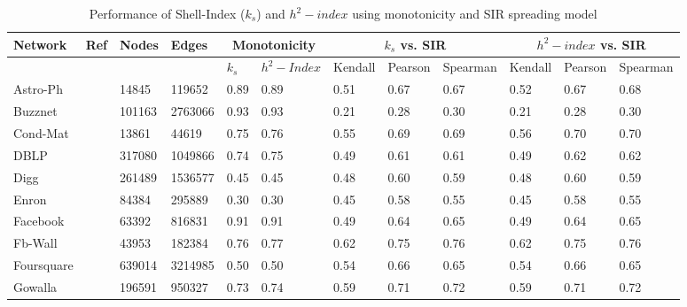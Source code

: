 \documentclass[conference]{IEEEtran}
\begin{document}
\begin{table}[htp]
\centering
\caption{Performance of Shell-Index ($k_s$) and $h^2-index$ using monotonicity and SIR spreading model}
\label{sec1results}
\begin{tabular}{|l|l|l|l|l|l|l|l|l|l|l|l|}
\hline
Network & Ref &  Nodes & Edges & \multicolumn{2}{|c|}{Monotonicity} & \multicolumn{3}{|c|}{$k_s$ vs. SIR} & \multicolumn{3}{|c|}{$h^2-index$ vs. SIR} \\ \hline

	&	&	&	&  $k_s$ & $h^2-Index$ & Kendall &  Pearson & Spearman & Kendall &  Pearson & Spearman \\	\hline
																			
Astro-Ph	&	\cite{leskovec2007graph}	&	14845	&	119652	&	0.89	&	0.89	&	0.51	&	0.67	&	0.67	&	0.52	&	0.67	&	0.68	\\ \hline
Buzznet	&	\cite{zafarani2009social}	&	101163	&	2763066	&	0.93	&	0.93	&	0.21	&	0.28	&	0.30	&	0.21	&	0.28	&	0.30	\\ \hline
Cond-Mat	&	\cite{leskovec2007graph}	&	13861	&	44619	&	0.75	&	0.76	&	0.55	&	0.69	&	0.69	&	0.56	&	0.70	&	0.70	\\ \hline
DBLP	&	\cite{yang2015defining}	&	317080	&	1049866	&	0.74	&	0.75	&	0.49	&	0.61	&	0.61	&	0.49	&	0.62	&	0.62	\\ \hline
Digg	&	\cite{hogg2012social}	&	261489	&	1536577	&	0.45	&	0.45	&	0.48	&	0.60	&	0.59	&	0.48	&	0.60	&	0.59	\\ \hline
Enron	&	\cite{klimt2004enron}	&	84384	&	295889	&	0.30	&	0.30	&	0.45	&	0.58	&	0.55	&	0.45	&	0.58	&	0.55	\\ \hline
Facebook	&	\cite{viswanath2009evolution}	&	63392	&	816831	&	0.91	&	0.91	&	0.49	&	0.64	&	0.65	&	0.49	&	0.64	&	0.65	\\ \hline
Fb-Wall	&	\cite{viswanath2009evolution}	&	43953	&	182384	&	0.76	&	0.77	&	0.62	&	0.75	&	0.76	&	0.62	&	0.75	&	0.76	\\ \hline
Foursquare	&	\cite{zafarani2009social}	&	639014	&	3214985	&	0.50	&	0.50	&	0.54	&	0.66	&	0.65	&	0.54	&	0.66	&	0.65	\\ \hline
Gowalla	&	\cite{cho2011friendship}	&	196591	&	950327	&	0.73	&	0.74	&	0.59	&	0.71	&	0.72	&	0.59	&	0.71	&	0.72	\\ \hline
																	
\end{tabular}	
\end{table}
\end{document}

